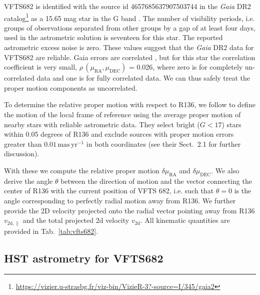 \documentclass[apjl,twocolumn]{emulateapj}
\newcommand{\masyr}{\,\mathrm{mas}\,\mathrm{yr}^{-1}}
\begin{document}
VFTS682 is identified with the source id 4657685637907503744 in the
\emph{Gaia} DR2 catalog\footnote{\url{https://vizier.u-strasbg.fr/viz-bin/VizieR-3?-source=I/345/gaia2}}
  as a 15.65 mag star in the G band
\citep{gaia:16,brown:18}.   The number of visibility periods,
i.e. groups of observations separated from other groups by a gap of at
least four days, used in the astrometric solution is seventeen for this
star. The reported astrometric excess noise is zero.  These values
suggest that the \emph{Gaia} DR2  data for VFTS682 are
reliable. Gaia errors are correlated \citep[][]{lindengren:18}, but for this star the correlation coefficient is very small, $\rho\,(\mu_\mathrm{RA}, \mu_\mathrm{DEC})$  = 0.026, where zero is for completely un-correlated data and one is for fully correlated data. We can thus safely treat the proper motion components as uncorrelated.

To determine the relative proper motion with respect to R136, we follow  \citet{lennon:18} to define the motion of the local frame of reference using the average proper motion of nearby stars with reliable astrometric data.  They select  bright ($G<17$) stars within 0.05 degrees of R136 and exclude sources with proper motion errors greater than $0.01\masyr$ in both coordinates (see their  Sect.~2.1 for further discussion).  

With these we compute the relative proper motion
$\delta\mu_\mathrm{RA}$ and $\delta\mu_\mathrm{DEC}$.  We also derive
the angle $\theta$ between the direction of motion and the vector
connecting the center of R136 with the current position of VFTS 682,
i.e. such that $\theta = 0$ is the angle corresponding to perfectly
radial motion away from R136.    We further provide the 2D velocity
projected onto the radial vector pointing away from R136
$v_\mathrm{2d, \parallel}$  and the total projected 2d velocity
$v_\mathrm{2d}$.   All kinematic quantities are provided in
Tab.~\ref{tab:vfts682}. %



\subsection{HST astrometry for VFTS682}
\end{document}
